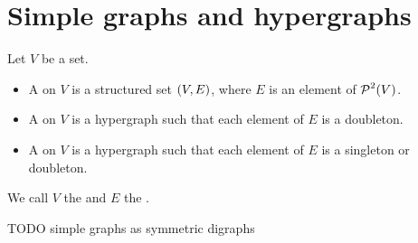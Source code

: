 \section{Simple graphs and hypergraphs}
\begin{definition}
Let $V$ be a set.
\begin{itemize}
\item A  on $V$ is a structured set $\left( V,E \right)$, where $E$ is an element of $\operatorname{\mathcal{P}}^2(V)$.
\item A  on $V$ is a hypergraph such that each element of $E$ is a doubleton.
\item A  on $V$ is a hypergraph such that each element of $E$ is a singleton or doubleton.
\end{itemize}
We call $V$ the  and $E$ the .
\end{definition}

TODO simple graphs as symmetric digraphs

